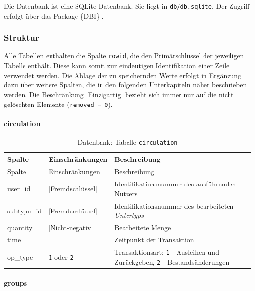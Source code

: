\documentclass[
]{article}
\begin{document}
Die Datenbank ist eine SQLite-Datenbank. Sie liegt in \texttt{db/db.sqlite}. Der Zugriff erfolgt über das Package \{DBI\} \autocite{R-DBI}.

\hypertarget{struktur}{%
\subsubsection{Struktur}\label{struktur}}

Alle Tabellen enthalten die Spalte \texttt{rowid}, die den Primärschlüssel der jeweiligen Tabelle enthält. Diese kann somit zur eindeutigen Identifikation einer Zeile verwendet werden. Die Ablage der zu speichernden Werte erfolgt in Ergänzung dazu über weitere Spalten, die in den folgenden Unterkapiteln näher beschrieben werden. Die Beschränkung {[}Einzigartig{]} bezieht sich immer nur auf die nicht gelöschten Elemente (\texttt{removed\ =\ 0}).

\hypertarget{circulation}{%
\paragraph{circulation}\label{circulation}}

\begin{longtable}[]{@{}
  >{\raggedright\arraybackslash}p{}
  >{\raggedright\arraybackslash}p{}
  >{\raggedright\arraybackslash}p{}@{}}
\caption{\label{tab:circulation} Datenbank: Tabelle \texttt{circulation}}\tabularnewline
\toprule
Spalte & Einschränkungen & Beschreibung \\
\midrule
\endfirsthead
\toprule
Spalte & Einschränkungen & Beschreibung \\
\midrule
\endhead
user\_id & {[}Fremdschlüssel{]} & Identifikationsnummer des ausführenden Nutzers \\
subtype\_id & {[}Fremdschlüssel{]} & Identifikationsnummer des bearbeiteten \emph{Untertyps} \\
quantity & {[}Nicht-negativ{]} & Bearbeitete Menge \\
time & & Zeitpunkt der Transaktion \\
op\_type & \texttt{1} oder \texttt{2} & Transaktionsart: \texttt{1} - Ausleihen und Zurückgeben, \texttt{2} - Bestandsänderungen \\
\bottomrule
\end{longtable}

\hypertarget{groups}{%
\paragraph{groups}\label{groups}}
\end{document}
